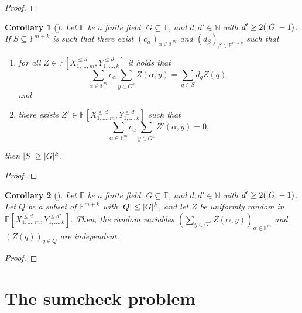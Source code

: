 \documentclass[english]{reedthesis}
\theoremstyle{plain}
\newtheorem{cor}[cor]{Corollary}
\theoremstyle{definition}
\theoremstyle{remark}
\DeclarePairedDelimiter{\abs}{\lvert}{\rvert}
\begin{document}
\begin{proof}
\end{proof}

\begin{cor}[{\cite[Corollary 12.2]{CFGS22}}]
  Let $\mathbb{F}$ be a finite field, $G \subseteq \mathbb{F}$, and $d, d' \in \mathbb{N}$ with
  $d' \ge 2(\abs{G} - 1)$. If $S \subseteq \mathbb{F}^{m+k}$ is such that there exist
  $(c_{\alpha})_{\alpha \in \mathbb{F}^{m}}$ and $(d_{\beta})_{\beta \in \mathbb{F}^{m+k}}$ such that
  \begin{enumerate}
    \item for all $Z \in \mathbb{F}[X_{1, \ldots, m}^{\le d}, Y_{1, \ldots, k}^{\le d}]$ it
          holds that
          \begin{equation}
            \sum_{\alpha \in \mathbb{F}^{m}}c_{\alpha}\sum_{y \in G^{k}}Z(\alpha, y) = \sum_{q \in S}d_{q}Z(q),
          \end{equation}
          and
    \item there exists $Z' \in \mathbb{F}[X_{1, \ldots, m}^{\le d}, Y_{1, \ldots, k}^{\le d}]$
          such that
          \begin{equation}
            \sum_{\alpha \in \mathbb{F}^{m}}c_{\alpha}\sum_{y \in G^{k}}Z'(\alpha, y) = 0,
          \end{equation}
  \end{enumerate}
  then $\abs{S} \ge \abs{G}^{k}$.
\end{cor}

\begin{proof}
\end{proof}

\begin{cor}[{\cite[Corollary 12.3]{CFGS22}}]
  Let $\mathbb{F}$ be a finite field, $G \subseteq \mathbb{F}$, and $d, d' \in \mathbb{N}$ with
  $d' \ge 2(\abs{G} - 1)$. Let $Q$ be a subset of $\mathbb{F}^{m+k}$ with
  $\abs{Q} \le \abs{G}^{k}$, and let $Z$ be uniformly random in
  $\mathbb{F}[X_{1, \ldots, m}^{\le d}, Y_{1, \ldots, k}^{\le d'}]$. Then, the random
  variables $(\sum_{y \in G^{k}}Z(\alpha, y))_{\alpha \in \mathbb{F}^{m}}$ and $(Z(q))_{q \in Q}$
  are independent.
\end{cor}

\begin{proof}
\end{proof}

\section{The sumcheck problem}
\end{document}
